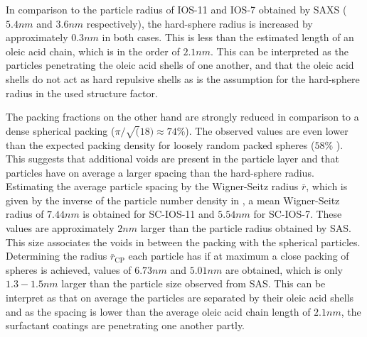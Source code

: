 \documentclass[\main/dresen_thesis.tex]{subfiles}
\begin{document}
  In comparison to the particle radius of IOS-11 and IOS-7 obtained by SAXS ($5.4 \unit{nm}$ and $3.6 \unit{nm}$ respectively), the hard-sphere radius is increased by approximately $0.3 \unit{nm}$ in both cases.
  This is less than the estimated length of an oleic acid chain, which is in the order of $2.1 \unit{nm}$.
  This can be interpreted as the particles penetrating the oleic acid shells of one another, and that the oleic acid shells do not act as hard repulsive shells as is the assumption for the hard-sphere radius in the used structure factor.

  The packing fractions on the other hand are strongly reduced in comparison to a dense spherical packing ($\pi / \sqrt(18) \approx 74 \%$).
  The observed values are even lower than the expected packing density for loosely random packed spheres ($58 \%$ \cite{Tory_1973_Simul, Shi_2008_Simul}).
  This suggests that additional voids are present in the particle layer and that particles have on average a larger spacing than the hard-sphere radius.
  Estimating the average particle spacing by the Wigner-Seitz radius $\bar{r}$, which is given by the inverse of the particle number density in , a mean Wigner-Seitz radius of $7.44 \unit{nm}$ is obtained for SC-IOS-11 and $5.54 \unit{nm}$ for SC-IOS-7.
  These values are approximately $2 \unit{nm}$ larger than the particle radius obtained by SAS.
  This size associates the voids in between the packing with the spherical particles.
  Determining the radius $\bar{r}_\mathrm{CP}$ each particle has if at maximum a close packing of spheres is achieved, values of $6.73 \unit{nm}$ and $5.01 \unit{nm}$ are obtained, which is only $1.3 - 1.5 \unit{nm}$ larger than the particle size observed from SAS.
  This can be interpret as that on average the particles are separated by their oleic acid shells and as the spacing is lower than the average oleic acid chain length of $2.1 \unit{nm}$, the surfactant coatings are penetrating one another partly.

\end{document}
